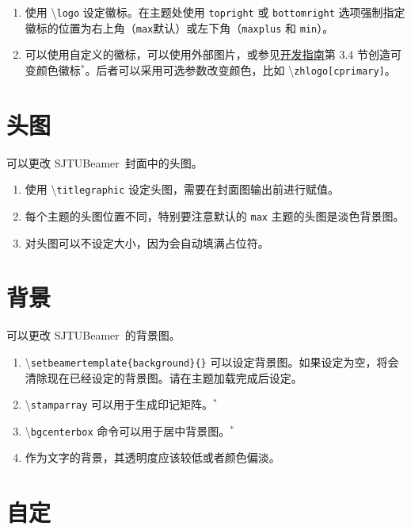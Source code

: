 \documentclass[
    UTF8,
    heading=true,
    12pt,
    a4paper
]{ctexrep}
\newenvironment{commentlist}{\begin{enumerate}\small}{\end{enumerate}}
\newcommand{\cmd}[1]{\textbackslash{}\texttt{#1}}
\def\themename{\textsf{SJTUBeamer}}
\begin{document}

\begin{commentlist}
  \item 使用 \cmd{logo} 设定徽标。在主题处使用 \verb"topright" 或 \verb"bottomright" 选项强制指定徽标的位置为右上角（\verb"max"默认）或左下角（\verb"maxplus" 和 \verb"min"）。
  \item 可以使用自定义的徽标，可以使用外部图片，或参见\href{run:sjtubeamerdevguide.pdf}{开发指南}第 3.4 节创造可变颜色徽标$^*$。后者可以采用可选参数改变颜色，比如 \cmd{zhlogo[cprimary]}。
\end{commentlist}

\chapter{头图}

可以更改 \themename\ 封面中的头图。


\begin{commentlist}
  \item 使用 \cmd{titlegraphic} 设定头图，需要在封面图输出前进行赋值。
  \item 每个主题的头图位置不同，特别要注意默认的 \texttt{max} 主题的头图是淡色背景图。
  \item 对头图可以不设定大小，因为会自动填满占位符。
\end{commentlist}

\chapter{背景}

可以更改 \themename\ 的背景图。


\begin{commentlist}
  \item \cmd{setbeamertemplate\{background\}\{\}} 可以设定背景图。如果设定为空，将会清除现在已经设定的背景图。请在主题加载完成后设定。
  \item \cmd{stamparray} 可以用于生成印记矩阵。$^*$
  \item \cmd{bgcenterbox} 命令可以用于居中背景图。$^*$
  \item 作为文字的背景，其透明度应该较低或者颜色偏淡。
\end{commentlist}

\chapter{自定}
\end{document}
